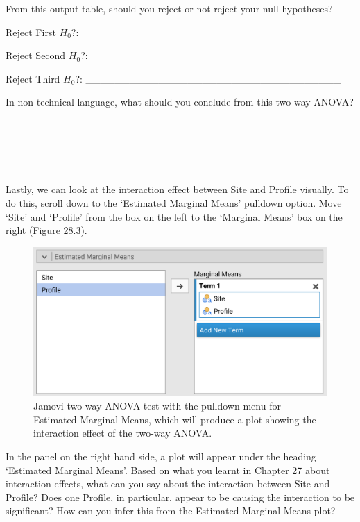 \documentclass[
  openany]{scrbook}
\begin{document}
From this output table, should you reject or not reject your null hypotheses?

Reject First \(H_{0}\)?: \_\_\_\_\_\_\_\_\_\_\_\_\_\_\_\_\_\_\_\_\_\_\_\_\_\_\_\_\_\_\_\_\_\_\_

Reject Second \(H_{0}\)?: \_\_\_\_\_\_\_\_\_\_\_\_\_\_\_\_\_\_\_\_\_\_\_\_\_\_\_\_\_\_\_\_\_\_\_

Reject Third \(H_{0}\)?: \_\_\_\_\_\_\_\_\_\_\_\_\_\_\_\_\_\_\_\_\_\_\_\_\_\_\_\_\_\_\_\_\_\_\_

In non-technical language, what should you conclude from this two-way ANOVA?

\begin{verbatim}





\end{verbatim}

Lastly, we can look at the interaction effect between Site and Profile visually.
To do this, scroll down to the `Estimated Marginal Means' pulldown option.
Move `Site' and `Profile' from the box on the left to the `Marginal Means' box on the right (Figure 28.3).

\begin{figure}
\includegraphics[width=1\linewidth]{img/jamovi_marginal_means} \caption{Jamovi two-way ANOVA test with the pulldown menu for Estimated Marginal Means, which will produce a plot showing the interaction effect of the two-way ANOVA.}\label{fig:unnamed-chunk-116}
\end{figure}

In the panel on the right hand side, a plot will appear under the heading `Estimated Marginal Means'.
Based on what you learnt in \protect\hyperlink{Chapter_27}{Chapter 27} about interaction effects, what can you say about the interaction between Site and Profile?
Does one Profile, in particular, appear to be causing the interaction to be significant?
How can you infer this from the Estimated Marginal Means plot?
\end{document}
